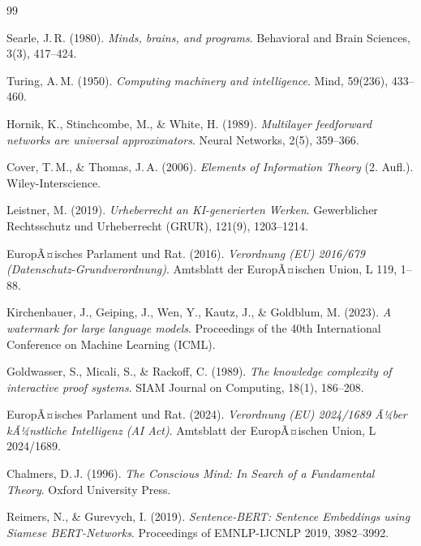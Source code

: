 ﻿\documentclass[a4paper,12pt]{article}
\theoremstyle{definition}
\begin{document}
\newpage

\begin{thebibliography}{99}

Searle, J.\,R. (1980).
\textit{Minds, brains, and programs}.
Behavioral and Brain Sciences, 3(3), 417--424.

Turing, A.\,M. (1950).
\textit{Computing machinery and intelligence}.
Mind, 59(236), 433--460.

Hornik, K., Stinchcombe, M., \& White, H. (1989).
\textit{Multilayer feedforward networks are universal approximators}.
Neural Networks, 2(5), 359--366.

Cover, T.\,M., \& Thomas, J.\,A. (2006).
\textit{Elements of Information Theory} (2. Aufl.).
Wiley-Interscience.

Leistner, M. (2019).
\textit{Urheberrecht an KI-generierten Werken}.
Gewerblicher Rechtsschutz und Urheberrecht (GRUR), 121(9), 1203--1214.

EuropÃ¤isches Parlament und Rat. (2016).
\textit{Verordnung (EU) 2016/679 (Datenschutz-Grundverordnung)}.
Amtsblatt der EuropÃ¤ischen Union, L 119, 1--88.

Kirchenbauer, J., Geiping, J., Wen, Y., Kautz, J., \& Goldblum, M. (2023).
\textit{A watermark for large language models}.
Proceedings of the 40th International Conference on Machine Learning (ICML).

Goldwasser, S., Micali, S., \& Rackoff, C. (1989).
\textit{The knowledge complexity of interactive proof systems}.
SIAM Journal on Computing, 18(1), 186--208.

EuropÃ¤isches Parlament und Rat. (2024).
\textit{Verordnung (EU) 2024/1689 Ã¼ber kÃ¼nstliche Intelligenz (AI Act)}.
Amtsblatt der EuropÃ¤ischen Union, L 2024/1689.

Chalmers, D.\,J. (1996).
\textit{The Conscious Mind: In Search of a Fundamental Theory}.
Oxford University Press.

Reimers, N., \& Gurevych, I. (2019).
\textit{Sentence-BERT: Sentence Embeddings using Siamese BERT-Networks}.
Proceedings of EMNLP-IJCNLP 2019, 3982--3992.


\end{thebibliography}
\end{document}
